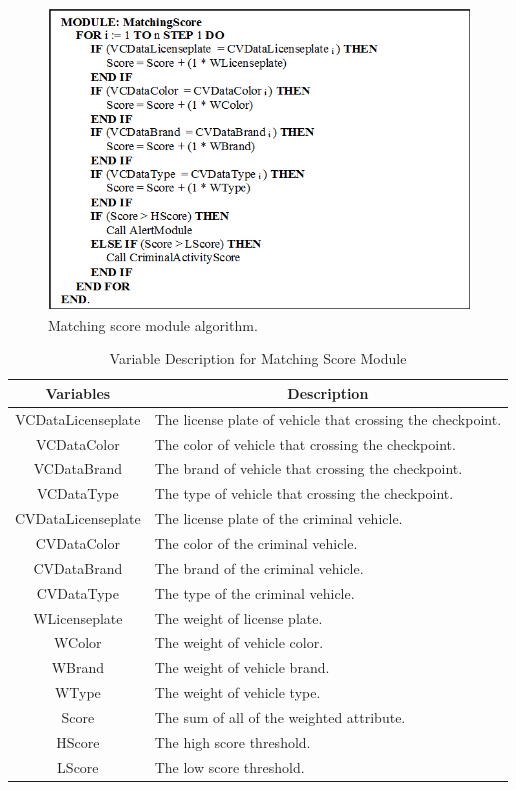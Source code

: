 \begin{figure}
\centering
\includegraphics[width=1\textwidth]{images/MatchingAlgorithm.jpg}
\caption{Matching score module algorithm.}
\label{fig:matchingAlgo}
\end{figure}

\begin{table}[!t]
\renewcommand{\arraystretch}{1.2}
\caption{Variable Description for Matching Score Module}
\label{table_variableMatching}
\centering
\begin{tabular}{c|l}
\hline
\bfseries Variables & \multicolumn{1}{c}{\bfseries Description}\\
\hline
VCDataLicenseplate & The license plate of vehicle that crossing the checkpoint.\\
\hline
VCDataColor & The color of vehicle that crossing the checkpoint.\\
\hline
VCDataBrand & The brand of vehicle that crossing the checkpoint.\\
\hline
VCDataType & The type of vehicle that crossing the checkpoint.\\
\hline
CVDataLicenseplate & The license plate of the criminal vehicle.\\
\hline
CVDataColor & The color of the criminal vehicle.\\
\hline
CVDataBrand & The brand of the criminal vehicle.\\
\hline
CVDataType & The type of the criminal vehicle.\\
\hline
WLicenseplate & The weight of license plate.\\
\hline
WColor & The weight of vehicle color.\\
\hline
WBrand & The weight of vehicle brand.\\
\hline
WType & The weight of vehicle type.\\
\hline
Score & The sum of all of the weighted attribute.\\
\hline
HScore & The high score threshold.\\
\hline
LScore & The low score threshold.\\
\hline
\end{tabular}
\end{table}

